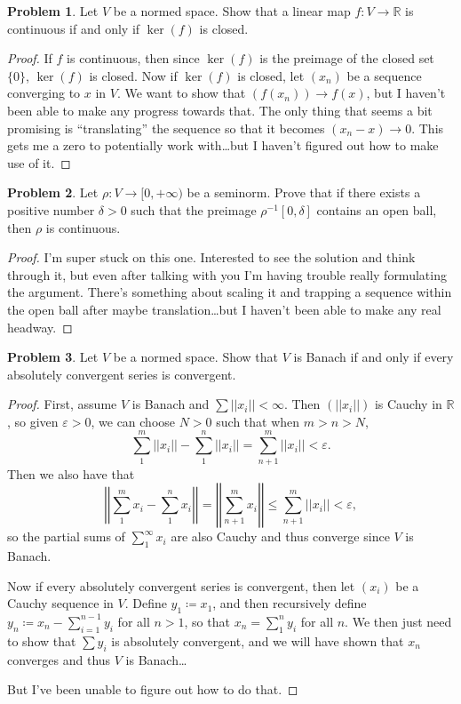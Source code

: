 \documentclass[12pt]{article}
\theoremstyle{definition}
\newtheorem{ex}{Problem}
\begin{document}
\begin{ex}
	Let $V$ be a normed space.
	Show that a linear map $f : V \to \mathbb{R}$ is continuous if and only if $\ker(f)$ is closed.
\end{ex}
\begin{proof}
	If $f$ is continuous, then since $\ker(f)$ is the preimage of the closed set $\lbrace 0 \rbrace$, $\ker(f)$ is closed.
	Now if $\ker(f)$ is closed, let $(x_n)$ be a sequence converging to $x$ in $V$.
	We want to show that $(f(x_n)) \to f(x)$, but I haven't been able to make any progress towards that.
	The only thing that seems a bit promising is ``translating'' the sequence so that it becomes $(x_n - x) \to 0$.
	This gets me a zero to potentially work with\dots but I haven't figured out how to make use of it.
\end{proof}

\begin{ex}
	Let $\rho : V \to [0, +\infty)$ be a seminorm.
	Prove that if there exists a positive number $\delta > 0$ such that the preimage $\rho^{-1}[0, \delta]$ contains an open ball, then $\rho$ is continuous.
\end{ex}
\begin{proof}
	I'm super stuck on this one.
	Interested to see the solution and think through it, but even after talking with you I'm having trouble really formulating the argument.
  There's something about scaling it and trapping a sequence within the open ball after maybe translation\dots but I haven't been able to make any real headway.
\end{proof}

\begin{ex}
	Let $V$ be a normed space.
	Show that $V$ is Banach if and only if every absolutely convergent series is convergent.
\end{ex}
\begin{proof}
	First, assume $V$ is Banach and $\sum ||x_i|| < \infty$.
	Then $(||x_i||)$ is Cauchy in $\mathbb{R}$, so given $\varepsilon > 0$, we can choose $N > 0$ such that when $m > n > N$, \begin{equation*}
		\sum_1^m||x_i|| - \sum_1^n||x_i|| = \sum_{n+1}^m||x_i|| < \varepsilon.
	\end{equation*}
	Then we also have that \begin{equation*}
		\left|\left|\sum_1^m x_i - \sum_1^n x_i\right|\right| = \left|\left|\sum_{n+1}^m x_i\right|\right| \leq \sum_{n+1}^m ||x_i|| < \varepsilon,
	\end{equation*}
	so the partial sums of $\sum_1^\infty x_i$ are also Cauchy and thus converge since $V$ is Banach.

	Now if every absolutely convergent series is convergent, then let $(x_i)$ be a Cauchy sequence in $V$.
	Define $y_1 \coloneq x_1$, and then recursively define $y_n \coloneq x_n - \sum_{i=1}^{n-1}y_i$ for all $n > 1$, so that $x_n = \sum_1^n y_i$ for all $n$.
	We then just need to show that $\sum y_i$ is absolutely convergent, and we will have shown that $x_n$ converges and thus $V$ is Banach\dots

	But I've been unable to figure out how to do that.
\end{proof}
\end{document}
